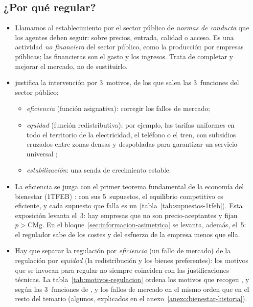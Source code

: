 \documentclass[11pt]{article}
\begin{document}
\subsection{¿Por qué regular?}\label{sec:por-que-regular}

\begin{itemize}
\item Llamamos  al establecimiento por el sector público de \emph{normas de conducta} que los agentes deben seguir: sobre precios, entrada, calidad o acceso. Es una actividad \emph{no financiera} del sector público, como la producción por empresas públicas; las financieras son el gasto y los ingresos. Trata de completar y mejorar el mercado, no de sustituirlo.
\item \textcite{Musgrave1959Theory} justifica la intervención por 3~motivos, de los que salen las 3~funciones del sector público:
  \begin{itemize}
  \item \emph{eficiencia} (función asignativa): corregir los fallos de mercado;
  \item \emph{equidad} (función redistributiva): por ejemplo, las tarifas uniformes en todo el territorio de la electricidad, el teléfono o el tren, con subsidios cruzados entre zonas densas y despobladas para garantizar un servicio universal ;
  \item \emph{estabilización}: una senda de crecimiento estable.
  \end{itemize}
\item La eficiencia se juzga con el primer teorema fundamental de la economía del bienestar (1TFEB) : con sus 5~supuestos, el equilibrio competitivo es eficiente, y cada supuesto que falla es un  (tabla~\ref{tab:supuestos-1tfeb}). Esta exposición levanta el~3: hay empresas que no son precio-aceptantes y fijan $p>\mathrm{CMg}$. En el bloque~\ref{sec:informacion-asimetrica} se levanta, además, el~5: el regulador sabe de los costes y del esfuerzo de la empresa menos que ella.
\end{itemize}

\begin{itemize}
\item Hay que separar la regulación por \emph{eficiencia} (un fallo de mercado) de la regulación por \emph{equidad} (la redistribución y los bienes preferentes): los motivos que se invocan para regular no siempre coinciden con las justificaciones técnicas\nocite{BaldwinCaveLodge2012Understanding}. La tabla~\ref{tab:motivos-regulacion} ordena los motivos que recogen ,  y  según las 3~funciones de , y los fallos de mercado en el mismo orden que en el resto del temario  (algunos, explicados en el anexo~\ref{anexo:bienestar-historia}).
\end{itemize}
\end{document}

